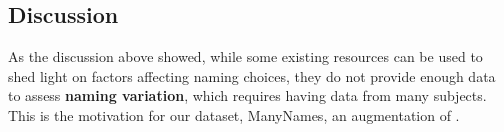 \subsection{Discussion}


As the discussion above showed, while some existing resources can be used to shed light on factors affecting naming choices, they do not provide enough data to assess \textbf{naming variation}, which requires having data from many subjects.
This is the motivation for our dataset, ManyNames, an augmentation of \vg.

